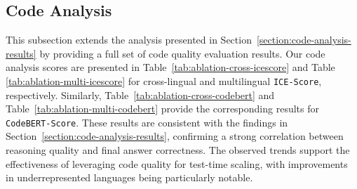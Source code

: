 \subsection{Code Analysis}
\label{ap:code-analysis}

This subsection extends the analysis presented in Section~\ref{section:code-analysis-results} by providing a full set of code quality evaluation results.
%
Our code analysis scores are presented in Table~\ref{tab:ablation-cross-icescore} and Table \ref{tab:ablation-multi-icescore} for cross-lingual and multilingual \texttt{ICE-Score}, respectively. Similarly, Table~\ref{tab:ablation-cross-codebert} and Table~\ref{tab:ablation-multi-codebert} provide the corresponding results for \texttt{CodeBERT-Score}.
%
These results are consistent with the findings in Section~\ref{section:code-analysis-results}, confirming a strong correlation between reasoning quality and final answer correctness. 
%
The observed trends support the effectiveness of leveraging code quality for test-time scaling, with improvements in underrepresented languages being particularly notable.

\begin{table*}[htbp]
\tiny
\centering
{}
\caption{
\texttt{ICE-Score} on MGSM for all cross-lingual PoT variants, providing the full results corresponding to the subset shown in Table \ref{tab:code-quality} 
}
\label{tab:ablation-cross-icescore}
\end{table*}


